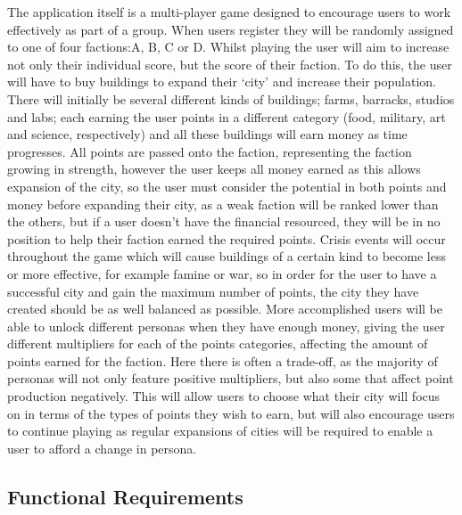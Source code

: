 \documentclass{sig-alt-release2}
\begin{document}
The application itself is a multi-player game designed to encourage users to work effectively as part of a group. When users register they will be randomly assigned to one of four factions:A, B, C or D. Whilst playing the user will aim to increase not only their individual score, but the score of their faction. To do this, the user will have to buy buildings to expand their `city' and increase their population. There will initially be several different kinds of buildings; farms, barracks, studios and labs; each earning the user points in a different category (food, military, art and science, respectively) and all these buildings will earn money as time progresses. All points are passed onto the faction, representing the faction growing in strength, however the user keeps all money earned as this allows expansion of the city, so the user must consider the potential in both points and money before expanding their city, as a weak faction will be ranked lower than the others, but if a user doesn't have the financial resourced, they will be in no position to help their faction earned the required points. Crisis events will occur throughout the game which will cause buildings of a certain kind to become less or more effective, for example famine or war, so in order for the user to have a successful city and gain the maximum number of points, the city they have created should be as well balanced as possible. More accomplished users will be able to unlock different personas when they have enough money, giving the user different multipliers for each of the points categories, affecting the amount of points earned for the faction. Here there is often a trade-off, as the majority of personas will not only feature positive multipliers, but also some that affect point production negatively. This will allow users to choose what their city will focus on in terms of the types of points they wish to earn, but will also encourage users to continue playing as regular expansions of cities will be required to enable a user to afford a change in persona.

\subsection{Functional Requirements}
\end{document}
